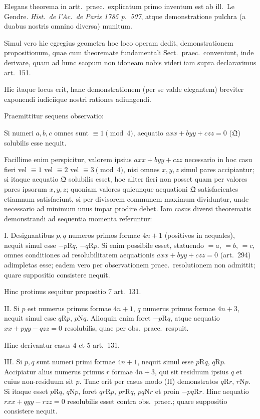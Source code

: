 \documentclass[12pt,a4paper]{article}
\theoremstyle{plain}
\theoremstyle{definition}
\theoremstyle{remark}
\begin{document}
Elegans theorema in artt.\@~praec.\ explicatum primo inventum est ab ill.\ Le
Gendre. \emph{Hist.\ de l'Ac.\ de Paris 1785 p.\@~507}, atque demonstratione pulchra
(a duabus nostris omnino diversa) munitum.

Simul vero hic egregius geometra hoc loco operam dedit, demonstrationem
propositionum, quae cum theoremate fundamentali Sect.\ praec.\ conveniunt, inde
derivare, quam ad hunc scopum non idoneam nobis videri iam supra declaravimus
art.\@~151.

Hie itaque locus erit, hanc demonstrationem (per se valde elegantem) breviter
exponendi iudiciique nostri rationes adiungendi.

Praemittitur sequens observatio:

Si numeri $a, b, c$ omnes sunt $\equiv 1 \pmod{4}$, aequatio
$axx + byy + czz = 0$ ($\mathfrak{Q}$) solubilis esse nequit.

Facillime enim perspicitur, valorem ipsius $axx + byy + czz$ necessario in
hoc casu fieri vel $\equiv 1$ vel $\equiv 2$ vel $\equiv 3 \pmod{4}$, nisi omnes $x, y, z$ simul
pares accipiantur; si itaque aequatio $\mathfrak{Q}$ solubilis esset, hoc aliter fieri non posset
quam per valores pares ipsorum $x, y, z$; quoniam valores quicunque aequationi
$\mathfrak{Q}$ satisfacientes etiamnum satisfaciunt, si per divisorem communem maximum
dividuntur, unde necessario ad minimum unus impar prodire debet. Iam casus
diversi theorematis demonstrandi ad sequentia momenta referuntur:

\textsc{I.} Designantibus $p, q$ numeros primos formae $4n+1$ (positivos in
aequales), nequit simul esse $-p \mathrel{\mathrm{R}} q$, $-q \mathrel{\mathrm{R}} p$.
Si enim possibile esset, statuendo $= a$, $= b$, $= c$, omnes conditiones ad
resolubilitatem aequationis $axx + byy + czz = 0$ (art.\@~294) adimpletas esse;
eadem vero per observationem praec.\ resolutionem non admittit; quare suppositio
consistere nequit.

Hinc protinus sequitur propositio 7 art.\@~131.

\textsc{II.} Si $p$ est numerus primus formae $4n+1$, $q$ numerus primus
formae $4n+3$, nequit simul esse $q \mathrel{\mathrm{R}} p$, $p \mathrel{\mathrm{N}} q$.
Alioquin enim foret $-p \mathrel{\mathrm{R}} q$, atque aequatio $xx + pyy - qzz = 0$
resolubilis, quae per obs.\ praec.\ respuit.

Hinc derivantur casus $4$ et $5$ art.\@~131.

\textsc{III.} Si $p, q$ sunt numeri primi formae $4n+1$, nequit simul esse
$p \mathrel{\mathrm{R}} q$, $q \mathrel{\mathrm{R}} p$.
Accipiatur alius numerus primus $r$ formae $4n+3$, qui sit residuum ipsius
$q$ et cuius non-residuum sit $p$. Tunc erit per casus modo (II) demonstratos
$q \mathrel{\mathrm{R}} r$, $r \mathrel{\mathrm{N}} p$. Si itaque esset $p \mathrel{\mathrm{R}} q$, $q \mathrel{\mathrm{N}} p$, foret $qr \mathrel{\mathrm{R}} p$, $pr \mathrel{\mathrm{R}} q$,
$pq \mathrel{\mathrm{N}} r$ et proin $-pq \mathrel{\mathrm{R}} r$. Hinc aequatio $rxx + qyy - rzz = 0$ resolubilis
esset contra obs.\ praec.; quare suppositio consistere nequit.
\end{document}
